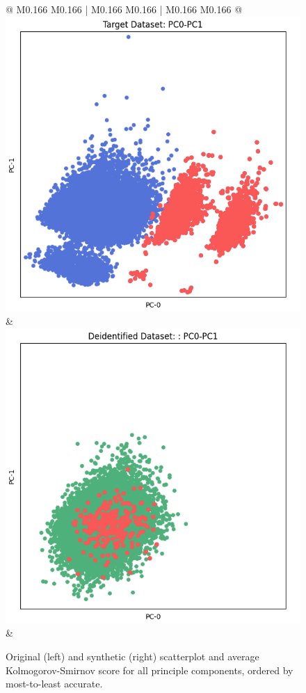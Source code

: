 \begin{figure}[p!]
\begin{tabular}{@{} M{0.166\textwidth} M{0.166\textwidth} | M{0.166\textwidth} M{0.166\textwidth} | M{0.166\textwidth} M{0.166\textwidth} @{}}
       \includegraphics[width=\linewidth]{z_Pategan.orig.png} &
       \includegraphics[width=\linewidth]{z_Pategan.syn.png} \\ 
 &
 \\ 
    \end{tabular}
\caption{Original (left) and synthetic (right) scatterplot and average Kolmogorov-Smirnov score for all principle components, ordered by most-to-least accurate.}
\label{fig:pca_grid}
\end{figure}